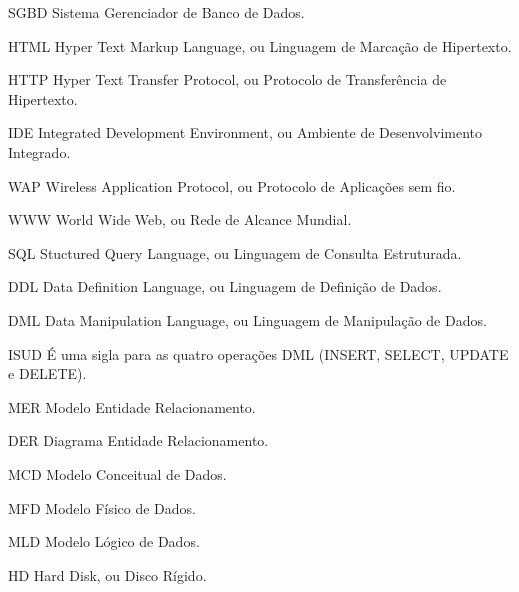 \begin{siglas}
	\item[SGBD] Sistema Gerenciador de Banco de Dados.
	\item[HTML] Hyper Text Markup Language, ou Linguagem de Marcação de Hipertexto.
	\item[HTTP] Hyper Text Transfer Protocol, ou Protocolo de Transferência de Hipertexto.
	\item[IDE]	Integrated Development Environment, ou Ambiente de Desenvolvimento Integrado.
	\item[WAP]	Wireless Application Protocol, ou Protocolo de Aplicações sem fio.
	\item[WWW]	World Wide Web, ou Rede de Alcance Mundial.
	\item[SQL]	Stuctured Query Language, ou Linguagem de Consulta Estruturada.
	\item[DDL]	Data Definition Language, ou Linguagem de Definição de Dados.
	\item[DML]	Data Manipulation Language, ou Linguagem de Manipulação de Dados.
	\item[ISUD]	É uma sigla para as quatro operações DML (INSERT, SELECT, UPDATE e DELETE).
	\item[MER]	Modelo Entidade Relacionamento. 
	\item[DER]	Diagrama Entidade Relacionamento.
	\item[MCD]	Modelo Conceitual de Dados. 
	\item[MFD]	Modelo Físico de Dados. 
	\item[MLD]	Modelo Lógico de Dados. 
	\item[HD]	Hard Disk, ou Disco Rígido. 

	
\end{siglas}